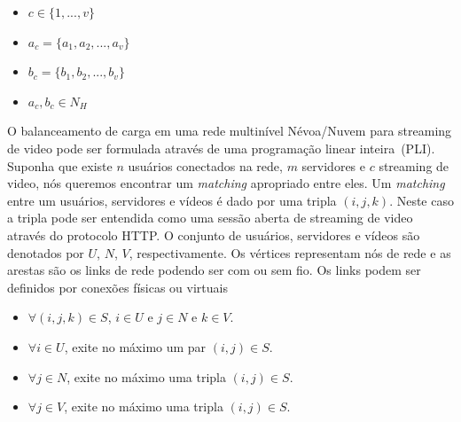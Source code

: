 \vspace{0.5cm}
\begin{itemize}

\item  $c \in \{1,...,v\}$

\item  $a_{c} = \{a_{1},a_{2},...,a_{v}\}$

\item  $b_{c} = \{b_{1},b_{2},...,b_{v}\}$

\item  $a_{c},b_{c} \in N_{H}$

\end{itemize}
\vspace{0.5cm}


O balanceamento de carga em uma rede multinível Névoa/Nuvem para streaming de video pode ser formulada através de uma programação linear inteira~(PLI).
Suponha que existe $n$ usuários conectados na rede, $m$ servidores e $c$ streaming de video, nós queremos encontrar um \textit{matching} apropriado entre eles. Um \textit{matching} entre um usuários, servidores e vídeos é dado por uma tripla $(i,j,k)$. Neste caso a tripla pode ser entendida como uma sessão aberta de streaming de video através do protocolo HTTP. O conjunto de usuários, servidores e vídeos são denotados por $U$, $N$, $V$, respectivamente.
Os vértices representam nós de rede e as arestas são os links de rede podendo ser com ou sem fio. Os links podem ser definidos por conexões físicas ou virtuais

\begin{itemize}
\item $\forall (i,j,k) \in S$, $i \in U$ e $j \in N$ e $k \in V$.

\item $\forall i \in U$, exite no máximo um par $(i,j) \in S$.

\item $\forall j \in N$, exite no máximo uma tripla $(i,j) \in S$.

\item $\forall j \in V$, exite no máximo uma tripla $(i,j) \in S$.
\end{itemize}


%
%
%
 
